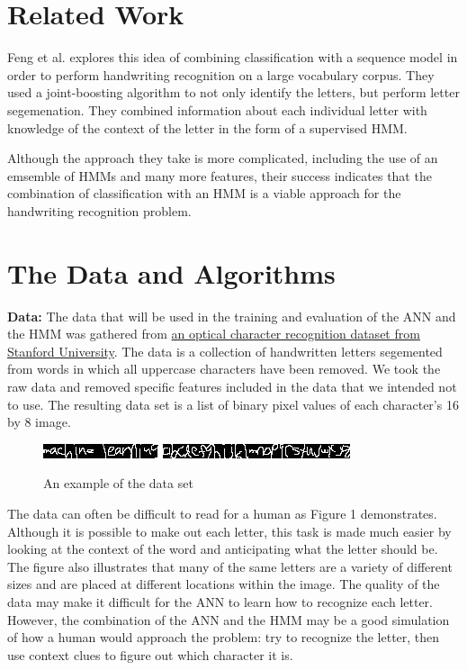 \documentclass[11pt,letterpaper]{article}
\begin{document}
\section{Related Work}

Feng et al. explores this idea of combining classification with a sequence
model in order to perform handwriting recognition on a large vocabulary corpus. They used a
joint-boosting algorithm to not only identify the letters, but perform letter segemenation. They
combined information about each individual letter with knowledge of the context of the letter in the
form of a supervised HMM.

Although the approach they take is more complicated, including the use of an emsemble of HMMs and
many more features, their success indicates that the combination of classification with an HMM is a
viable approach for the handwriting recognition problem.

\section{The Data and Algorithms}

{\bf Data:} The data that will be used in the training and evaluation of the ANN and the HMM was gathered from
\href{http://ai.stanford.edu/~btaskar/ocr/}{an optical character recognition dataset from
Stanford University}.
The data is a collection of handwritten letters segemented from words in which all uppercase
characters have been removed. We took the raw data and removed specific features included in the
data that we intended not to use. The resulting data set is a list of binary pixel values of each
character's 16 by 8 image.  \begin{figure}[h]
    \centering
    \includegraphics{img/ml.jpg}
    \includegraphics{img/alphabet.jpg}
    \caption{An example of the data set}
\end{figure}

The data can often be difficult to read for a human as Figure 1 demonstrates.  Although it is
possible to make out each letter, this task is made much easier by looking at the context of the
word and anticipating what the letter should be. The figure also illustrates that many of the same
letters are a variety of different sizes and are placed at different locations within the image. The
quality of the data may make it difficult for the ANN to learn how to recognize each letter.
However, the combination of the ANN and the HMM may be a good simulation of how a human would
approach the problem: try to recognize the letter, then use context clues to figure out which
character it is.
\end{document}
